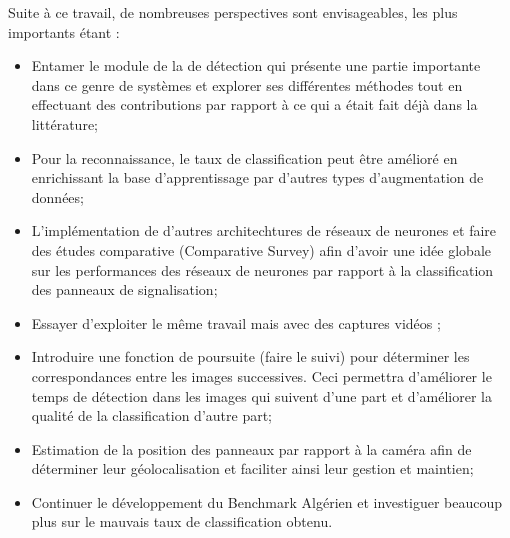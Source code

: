 Suite à ce travail, de nombreuses perspectives sont envisageables, les plus importants étant :
\begin{itemize}
    \item Entamer le module de la  de détection qui présente une partie importante dans ce genre de systèmes et explorer ses différentes méthodes tout en effectuant des contributions par rapport à ce qui a était fait déjà dans la littérature;
    \item Pour la reconnaissance, le taux de classification peut être amélioré en enrichissant la base d’apprentissage par d’autres types d’augmentation de données;
    \item L'implémentation de d'autres architechtures de réseaux de neurones et faire des études comparative (Comparative Survey) afin d'avoir une idée globale sur les performances des réseaux de neurones par rapport à la classification des panneaux de signalisation;
    \item Essayer d'exploiter le même travail mais avec des captures vidéos ;
    \item Introduire une fonction de poursuite (faire le suivi) pour déterminer les correspondances entre les images successives. Ceci permettra d’améliorer le temps de détection dans les images qui suivent d’une part et d’améliorer la qualité de la classification d’autre part;
    \item Estimation de la position des panneaux par rapport à la caméra afin de déterminer leur géolocalisation et faciliter ainsi leur gestion et maintien;
    \item Continuer le développement du Benchmark Algérien et investiguer beaucoup plus sur le mauvais taux de classification obtenu.

\end{itemize}





